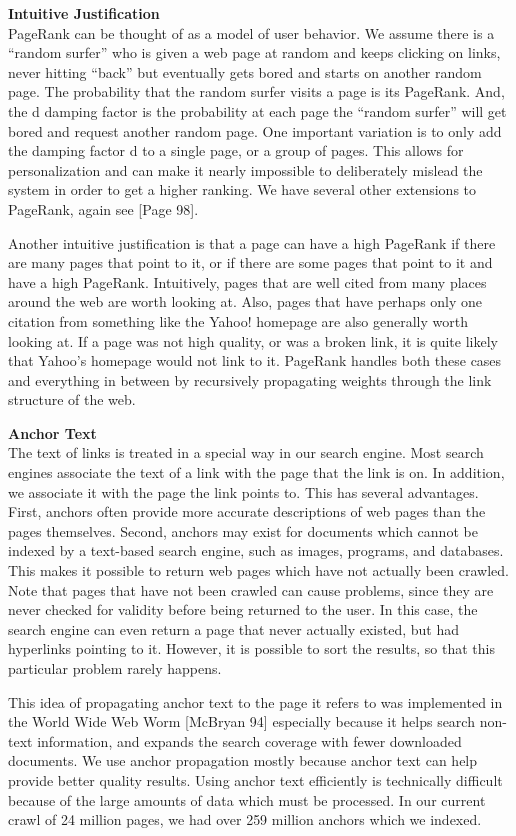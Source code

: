 \documentclass[]{book}
\theoremstyle{definition}
\theoremstyle{definition}
\theoremstyle{definition}
\theoremstyle{remark}
\begin{document}
\textbf{Intuitive Justification}\\
PageRank can be thought of as a model of user behavior. We assume there
is a ``random surfer'' who is given a web page at random and keeps
clicking on links, never hitting ``back'' but eventually gets bored and
starts on another random page. The probability that the random surfer
visits a page is its PageRank. And, the d damping factor is the
probability at each page the ``random surfer'' will get bored and
request another random page. One important variation is to only add the
damping factor d to a single page, or a group of pages. This allows for
personalization and can make it nearly impossible to deliberately
mislead the system in order to get a higher ranking. We have several
other extensions to PageRank, again see {[}Page 98{]}.

Another intuitive justification is that a page can have a high PageRank
if there are many pages that point to it, or if there are some pages
that point to it and have a high PageRank. Intuitively, pages that are
well cited from many places around the web are worth looking at. Also,
pages that have perhaps only one citation from something like the Yahoo!
homepage are also generally worth looking at. If a page was not high
quality, or was a broken link, it is quite likely that Yahoo's homepage
would not link to it. PageRank handles both these cases and everything
in between by recursively propagating weights through the link structure
of the web.

\textbf{Anchor Text}\\
The text of links is treated in a special way in our search engine. Most
search engines associate the text of a link with the page that the link
is on. In addition, we associate it with the page the link points to.
This has several advantages. First, anchors often provide more accurate
descriptions of web pages than the pages themselves. Second, anchors may
exist for documents which cannot be indexed by a text-based search
engine, such as images, programs, and databases. This makes it possible
to return web pages which have not actually been crawled. Note that
pages that have not been crawled can cause problems, since they are
never checked for validity before being returned to the user. In this
case, the search engine can even return a page that never actually
existed, but had hyperlinks pointing to it. However, it is possible to
sort the results, so that this particular problem rarely happens.

This idea of propagating anchor text to the page it refers to was
implemented in the World Wide Web Worm {[}McBryan 94{]} especially
because it helps search non-text information, and expands the search
coverage with fewer downloaded documents. We use anchor propagation
mostly because anchor text can help provide better quality results.
Using anchor text efficiently is technically difficult because of the
large amounts of data which must be processed. In our current crawl of
24 million pages, we had over 259 million anchors which we indexed.
\end{document}
